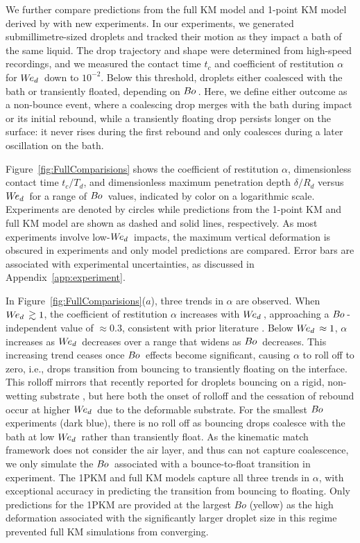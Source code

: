 \documentclass{jfm}
\newcommand{\Bo}{B\kern-0.04em o\,}
\newcommand{\Wed}{W\kern-0.15em e _d\,}
\begin{document}
We further compare predictions from the full KM model and 1-point KM model derived by \citet{AlventosaEtAl2023} with new experiments. In our experiments, we generated submillimetre-sized droplets  and tracked their motion as they impact a bath of the same liquid. The drop trajectory and shape were determined from high-speed recordings, and we measured the contact time $t_c$ and coefficient of restitution $\alpha$ for $\Wed$ down to $10^{-2}$. Below this threshold, droplets either coalesced with the bath or transiently floated, depending on $\Bo$. Here, we define either outcome as a non-bounce event, where a coalescing drop merges with the bath during impact or its initial rebound, while a transiently floating drop persists longer on the surface: it never rises during the first rebound and only coalesces during a later oscillation on the bath. %

Figure~\ref{fig:FullComparisions} shows the coefficient of restitution $\alpha$, dimensionless contact time $t_{c} / T_{d}$, and dimensionless maximum penetration depth $\delta / R_{d}$ versus $\Wed$ for a range of $\Bo$ values, indicated by color on a logarithmic scale. Experiments are denoted by circles while predictions from the 1-point KM and full KM model are shown as dashed and solid lines, respectively. As most experiments involve low-$\Wed$ impacts, the maximum vertical deformation is obscured in experiments and only model predictions are compared. Error bars are associated with experimental uncertainties, as discussed in Appendix~\ref{app:experiment}.

In Figure~\ref{fig:FullComparisions}($a$), three trends in $\alpha$ are observed. When $\Wed \gtrsim 1$, the coefficient of restitution $\alpha$ increases with $\Wed$, approaching a $\Bo$-independent value of $\approx0.3$, consistent with prior literature \citep{bach2004coalescence,wu2020small,AlventosaEtAl2023}. Below $\Wed \approx 1$, $\alpha$ increases as $\Wed$ decreases over a range that widens as $\Bo$ decreases. This increasing trend ceases once $\Bo$ effects become significant, causing $\alpha$ to roll off to zero, i.e., drops transition from bouncing to transiently floating on the interface. This rolloff mirrors that recently reported for droplets bouncing on a rigid, non-wetting substrate \citep{GabbardEtAl2025}, but here both the onset of rolloff and the cessation of rebound occur at higher $\Wed$ due to the deformable substrate. For the smallest $\Bo$ experiments (dark blue), there is no roll off as bouncing drops coalesce with the bath at low $\Wed$ rather than transiently float. As the kinematic match framework does not consider the air layer, and thus can not capture coalescence, we only simulate the $\Bo$ associated with a bounce-to-float transition in experiment.  The 1PKM and full KM models capture all three trends in $\alpha$, with exceptional accuracy in predicting the transition from bouncing to floating. Only predictions for the 1PKM are provided at the largest $Bo$ (yellow) as the high deformation associated with the significantly larger droplet size in this regime prevented full KM simulations from converging.
\end{document}
